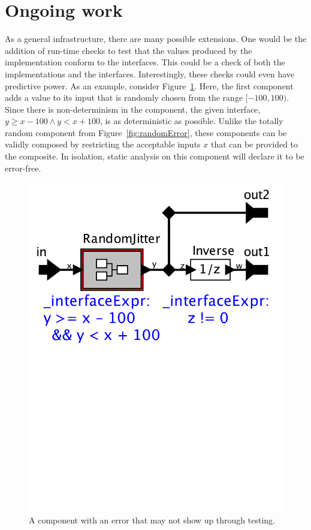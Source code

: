 \documentclass[preprint,11pt]{sigplanconf}
\begin{document}
\section{Ongoing work}
As a general infrastructure, there are many possible extensions.
One would be the addition of run-time checks to test that the values produced
by the implementation conform to the interfaces. This could be a check of both
the implementations and the interfaces. Interestingly, these checks could even
have predictive power. As an example, consider Figure~\ref{fig:randomJitter}.
Here, the first component adds a value to its input that is randomly chosen
from the range $[-100,100)$. Since there is non-determinism in the component,
the given interface, $y \ge x-100 \wedge y < x+100$, is as deterministic as
possible. Unlike the totally random component from Figure~\ref{fig:randomError}, these
components can be validly composed by restricting the acceptable inputs $x$
that can be provided to the composite. In isolation, static analysis on this
component will declare it to be error-free. \begin{figure}[htbp]
\centering
\includegraphics[width=\columnwidth]{figs/randomJitter}
\caption{A component with an error that may not show up through testing.}
\label{fig:randomJitter}
\end{figure}
\end{document}
